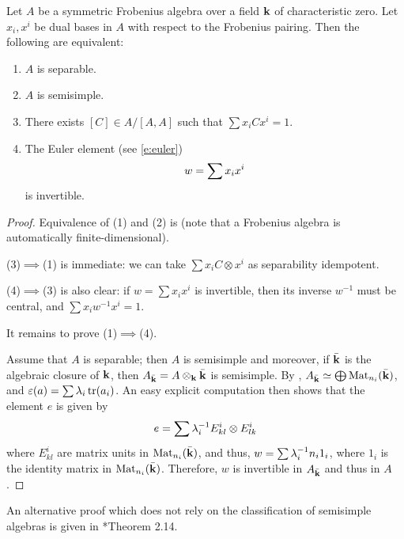 \begin{theorem}\label{t:separable-frobenius}
  Let $A$ be a symmetric Frobenius algebra over a field $\mathbf{k}$ of characteristic
  zero. Let $x_i, x^i$ be dual bases in $A$ with respect to the Frobenius
  pairing. Then the following are equivalent:
  \begin{enumerate}
    \item $A$ is separable.
    \item $A$ is semisimple.
    \item There exists $[C]\in A/[A,A]$ such that $\sum x_iCx^i=1$.
    \item The Euler element \textup{(}see \eqref{e:euler}\textup{)}
      \begin{equation}\label{e:euler2}\index{Euler element}
        w=\sum x_ix^i
      \end{equation}
      is invertible.
  \end{enumerate}
\end{theorem}
\begin{proof}
  Equivalence of (1) and (2) is 
  (note that a Frobenius algebra is automatically finite-dimensional).

  (3)$\implies$(1) is immediate: we can take $\sum x_i C\otimes x^i$ as
  separability idempotent.

  (4)$\implies$(3) is also clear: if $w=\sum x_i x^i$ is invertible, then its
  inverse $w^{-1}$ must be central, and $\sum x_i w^{-1} x^i=1$.

  It remains to prove (1)$\implies$(4).

  Assume that $A$ is separable; then $A$ is semisimple and moreover, if
  $\bar {\mathbf{k}}$ is the algebraic closure of $\mathbf{k}$, then
  $A_{\bar {\mathbf{k}}}=A\otimes_{\mathbf{k}} \bar{\mathbf{k}}$ is semisimple. By
  , $A_{\bar{\mathbf{k}}}\simeq\bigoplus \operatorname{Mat}_{n_i}(\bar {\mathbf{k}})$,
  and $\varepsilon(a)=\sum \lambda_i \operatorname{tr}(a_i)$.
  An easy explicit computation then shows that the element $e$ is given by
  $$
    e = \sum \lambda_i^{-1}E^i_{kl}\otimes E^i_{lk}
  $$
  where $E^i_{kl}$ are matrix units in $\operatorname{Mat}_{n_i}(\bar {\mathbf{k}})$,
  and thus, $w=\sum \lambda_i^{-1} n_i 1_i$, where $1_i$ is the identity matrix in
  $\operatorname{Mat}_{n_i}(\bar {\mathbf{k}})$. Therefore, $w$ is invertible in $A_{\bar {\mathbf{k}}}$
  and thus in $A$.
\end{proof}
\begin{remark}
  An alternative proof which does not rely on the classification of
  semisimple algebras is given in *{Theorem 2.14}.
\end{remark}

